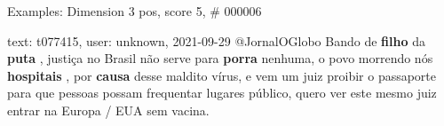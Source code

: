 \begin{frame}{Examples: Dimension 3 pos, score 5, \# 000006}
\footnotesize
\begin{exampleblock}{text: t077415, user: unknown, 2021-09-29}
@JornalOGlobo Bando de \textbf{filho} da \textbf{puta} , justiça no Brasil não 
serve para \textbf{porra} nenhuma, o povo morrendo nós \textbf{hospitais} , por 
\textbf{causa} desse maldito vírus, e vem um juiz proibir o passaporte para que 
pessoas possam frequentar lugares público, quero ver este mesmo juiz entrar na 
Europa / EUA sem vacina. 
\end{exampleblock}
\end{frame}
